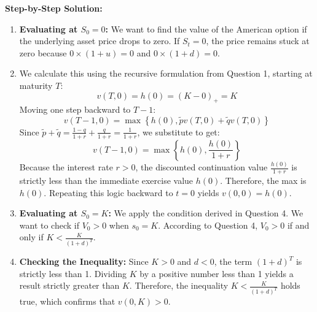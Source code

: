 \textbf{Step-by-Step Solution:}
\begin{enumerate}
    \item \textbf{Evaluating at $S_0 = 0$:} We want to find the value of the American option if the underlying asset price drops to zero. If $S_t = 0$, the price remains stuck at zero because $0 \times (1+u) = 0$ and $0 \times (1+d) = 0$.
    \item We calculate this using the recursive formulation from Question 1, starting at maturity $T$:
    \begin{equation*}
        v(T,0) = h(0) = (K-0)_+ = K
    \end{equation*}
    Moving one step backward to $T-1$:
    \begin{equation*}
        v(T-1,0) = \max\left\{ h(0), \tilde{p} v(T,0) + \tilde{q} v(T,0) \right\}
    \end{equation*}
    Since $\tilde{p} + \tilde{q} = \frac{1-q}{1+r} + \frac{q}{1+r} = \frac{1}{1+r}$, we substitute to get:
    \begin{equation*}
        v(T-1,0) = \max\left\{ h(0), \frac{h(0)}{1+r} \right\}
    \end{equation*}
    Because the interest rate $r > 0$, the discounted continuation value $\frac{h(0)}{1+r}$ is strictly less than the immediate exercise value $h(0)$. Therefore, the max is $h(0)$. Repeating this logic backward to $t=0$ yields $v(0,0) = h(0)$.
    
    \item \textbf{Evaluating at $S_0 = K$:} We apply the condition derived in Question 4. We want to check if $V_0 > 0$ when $s_0 = K$.
    According to Question 4, $V_0 > 0$ if and only if $K < \frac{K}{(1+d)^T}$.
    \item \textbf{Checking the Inequality:} Since $K > 0$ and $d < 0$, the term $(1+d)^T$ is strictly less than 1. Dividing $K$ by a positive number less than 1 yields a result strictly greater than $K$. 
    Therefore, the inequality $K < \frac{K}{(1+d)^T}$ holds true, which confirms that $v(0,K) > 0$.
\end{enumerate}